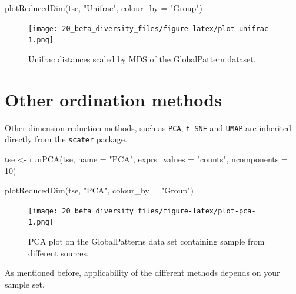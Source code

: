 \documentclass[
]{book}
\newenvironment{Shaded}{\begin{snugshade}}{\end{snugshade}}
\newcommand{\AttributeTok}[1]{\textcolor[rgb]{0.77,0.63,0.00}{#1}}
\newcommand{\DecValTok}[1]{\textcolor[rgb]{0.00,0.00,0.81}{#1}}
\newcommand{\FunctionTok}[1]{\textcolor[rgb]{0.00,0.00,0.00}{#1}}
\newcommand{\NormalTok}[1]{#1}
\newcommand{\OtherTok}[1]{\textcolor[rgb]{0.56,0.35,0.01}{#1}}
\newcommand{\StringTok}[1]{\textcolor[rgb]{0.31,0.60,0.02}{#1}}
\begin{document}
\begin{Shaded}
\begin{Highlighting}[]
\FunctionTok{plotReducedDim}\NormalTok{(tse, }\StringTok{"Unifrac"}\NormalTok{, }\AttributeTok{colour\_by =} \StringTok{"Group"}\NormalTok{)}
\end{Highlighting}
\end{Shaded}

\begin{figure}
\centering
\texttt{[image: 20\_beta\_diversity\_files/figure-latex/plot-unifrac-1.png]}
\caption{\label{fig:plot-unifrac}Unifrac distances scaled by MDS of the GlobalPattern dataset.}
\end{figure}

\hypertarget{other-ordination-methods}{%
\section{Other ordination methods}\label{other-ordination-methods}}

Other dimension reduction methods, such as \texttt{PCA}, \texttt{t-SNE} and \texttt{UMAP} are
inherited directly from the \texttt{scater} package.

\begin{Shaded}
\begin{Highlighting}[]
\NormalTok{tse }\OtherTok{\textless{}{-}} \FunctionTok{runPCA}\NormalTok{(tse, }\AttributeTok{name =} \StringTok{"PCA"}\NormalTok{, }\AttributeTok{exprs\_values =} \StringTok{"counts"}\NormalTok{, }\AttributeTok{ncomponents =} \DecValTok{10}\NormalTok{)}
\end{Highlighting}
\end{Shaded}

\begin{Shaded}
\begin{Highlighting}[]
\FunctionTok{plotReducedDim}\NormalTok{(tse, }\StringTok{"PCA"}\NormalTok{, }\AttributeTok{colour\_by =} \StringTok{"Group"}\NormalTok{)}
\end{Highlighting}
\end{Shaded}

\begin{figure}
\centering
\texttt{[image: 20\_beta\_diversity\_files/figure-latex/plot-pca-1.png]}
\caption{\label{fig:plot-pca}PCA plot on the GlobalPatterns data set containing sample from different sources.}
\end{figure}

As mentioned before, applicability of the different methods depends on your
sample set.
\end{document}
